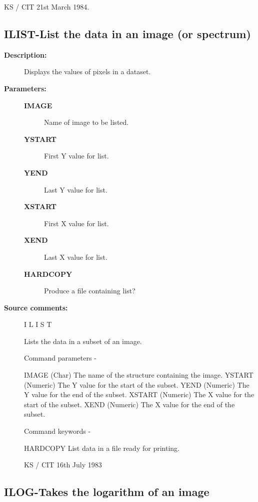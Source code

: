 \begin{description}
\begin{description}
\begin{terminalv}
                                           KS / CIT 21st March 1984.
\end{terminalv}
\end{description}
\subsection{ILIST-\label{ILIST}List the data in an image (or spectrum)}
\begin{description}

\item [\textbf{Description:}]
 Displays the values of pixels in a dataset.

\item [\textbf{Parameters:}]
\begin{description}
\item [\textbf{IMAGE}]
 Name of image to be listed.
\item [\textbf{YSTART}]
 First Y value for list.
\item [\textbf{YEND}]
 Last Y value for list.
\item [\textbf{XSTART}]
 First X value for list.
\item [\textbf{XEND}]
 Last X value for list.
\item [\textbf{HARDCOPY}]
 Produce a file containing list?
\end{description}

\item [\textbf{Source comments:}]
\begin{terminalv}
 I L I S T

 Lists the data in a subset of an image.

 Command parameters -

 IMAGE  (Char)    The name of the structure containing the image.
 YSTART (Numeric) The Y value for the start of the subset.
 YEND   (Numeric) The Y value for the end of the subset.
 XSTART (Numeric) The X value for the start of the subset.
 XEND   (Numeric) The X value for the end of the subset.

 Command keywords -

 HARDCOPY   List data in a file ready for printing.

                                  KS / CIT 16th July 1983
\end{terminalv}
\end{description}
\subsection{ILOG-\label{ILOG}Takes the logarithm of an image}
\begin{description}


\end{description}
\end{description}
